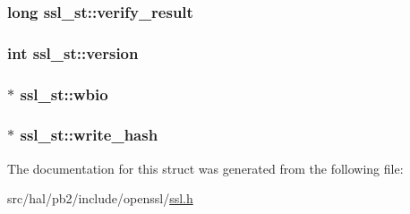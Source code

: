 \subsubsection[{\texorpdfstring{verify\+\_\+result}{verify_result}}]{\setlength{\rightskip}{0pt plus 5cm}long ssl\+\_\+st\+::verify\+\_\+result}\hypertarget{structssl__st_a3092706c43455cf6a410853d90aadb1f}{}\label{structssl__st_a3092706c43455cf6a410853d90aadb1f}
\subsubsection[{\texorpdfstring{version}{version}}]{\setlength{\rightskip}{0pt plus 5cm}int ssl\+\_\+st\+::version}\hypertarget{structssl__st_a104b2a57e68e7e8c228c34d9ffb0e3dd}{}\label{structssl__st_a104b2a57e68e7e8c228c34d9ffb0e3dd}
\subsubsection[{\texorpdfstring{wbio}{wbio}}]{$\ast$ ssl\+\_\+st\+::wbio}\hypertarget{structssl__st_a81a174cdc5f516202537ff6fef6680ed}{}\label{structssl__st_a81a174cdc5f516202537ff6fef6680ed}
\subsubsection[{\texorpdfstring{write\+\_\+hash}{write_hash}}]{$\ast$ ssl\+\_\+st\+::write\+\_\+hash}\hypertarget{structssl__st_a491e1c0b9386b4003bb443af4a2d06d4}{}\label{structssl__st_a491e1c0b9386b4003bb443af4a2d06d4}


The documentation for this struct was generated from the following file\+:\begin{DoxyCompactItemize}
\item 
src/hal/pb2/include/openssl/\hyperlink{ssl_8h}{ssl.\+h}\end{DoxyCompactItemize}
